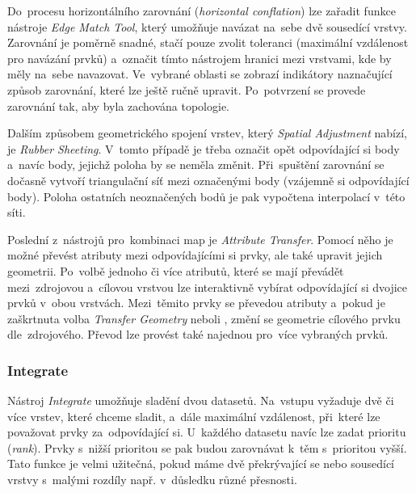Do~procesu horizontálního zarovnání (\textit{horizontal conflation}) lze 
zařadit funkce nástroje \textit{Edge Match Tool}, který umožňuje navázat 
na~sebe dvě sousedící vrstvy. Zarovnání je poměrně snadné, stačí pouze 
zvolit toleranci (maximální vzdálenost pro navázání prvků) a~označit tímto
nástrojem hranici mezi vrstvami, kde by měly na~sebe navazovat. Ve~vybrané
oblasti se zobrazí indikátory naznačující způsob zarovnání, které lze ještě
ručně upravit. Po~potvrzení se provede zarovnání tak, aby byla zachována
topologie.

Dalším způsobem geometrického spojení vrstev, který \textit{Spatial Adjustment}
nabízí, je \textit{Rubber Sheeting}. V~tomto případě je třeba označit opět 
odpovídající si body a~navíc body, jejichž poloha by se neměla změnit. 
Při~spuštění zarovnání se dočasně vytvoří triangulační síť mezi označenými body
(vzájemně si odpovídající body). Poloha ostatních neoznačených bodů je pak 
vypočtena interpolací v~této síti.

Poslední z~nástrojů pro~kombinaci map je \textit{Attribute Transfer}. Pomocí 
něho je možné převést atributy mezi odpovídajícími si prvky, ale také upravit
jejich geometrii. Po~volbě jednoho či více atributů, které se mají převádět 
mezi~zdrojovou a~cílovou vrstvou lze interaktivně vybírat odpovídající si 
dvojice prvků v~obou vrstvách. Mezi~těmito prvky se převedou atributy a~pokud
je zaškrtnuta volba \textit{Transfer Geometry} neboli ,
změní se geometrie cílového prvku dle~zdrojového. Převod lze provést také 
najednou pro~více vybraných prvků.

\subsubsection{Integrate}

Nástroj \textit{Integrate} umožňuje sladění dvou datasetů. Na~vstupu vyžaduje 
dvě či více vrstev, které chceme sladit, a~dále maximální vzdálenost, při~které
lze považovat prvky za~odpovídající si. U~každého datasetu navíc lze zadat 
prioritu (\textit{rank}). Prvky s~nižší prioritou se pak budou zarovnávat 
k~těm s~prioritou vyšší. Tato funkce je velmi užitečná, pokud máme dvě 
překrývající se nebo sousedící vrstvy s~malými rozdíly např. v~důsledku různé
přesnosti.

